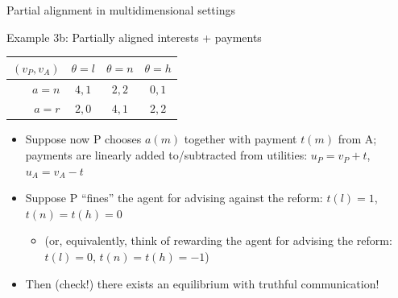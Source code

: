\documentclass[english,10pt
,aspectratio=169
]{beamer}
\begin{document}
\begin{frame}{Partial alignment in multidimensional settings}
	\begin{exampleblock}{Example 3b: Partially aligned interests + payments}
		\begin{center}
			\begin{tabular}{r | c | c | c |}
				$(v_P,v_A)$	& $\theta=l$	& $\theta=n$ 	& $\theta=h$
				\\ \hline 
				$a=n$ 		& $4,1$			& $2,2$			& $0,1$
				\\ \hline
				$a=r$		& $2,0$			& $4,1$			& $2,2$
				\\ \hline 
			\end{tabular}
		\end{center}
	\end{exampleblock}
	\begin{itemize}
		\item Suppose now P chooses $a(m)$ together with payment $t(m)$ from A; payments are linearly added to/subtracted from utilities: $u_P = v_P + t$, $u_A = v_A - t$
		\pause
		\item Suppose P ``fines'' the agent for advising against the reform: $t(l) = 1$, $t(n) = t(h) = 0$
		\begin{itemize}
			\item (or, equivalently, think of rewarding the agent for advising the reform: $t(l) = 0$, $t(n)=t(h) = -1$)
		\end{itemize}
		\pause
		\item Then (check!) there exists an equilibrium with truthful communication!
	\end{itemize}
\end{frame}


%	
\end{document}
